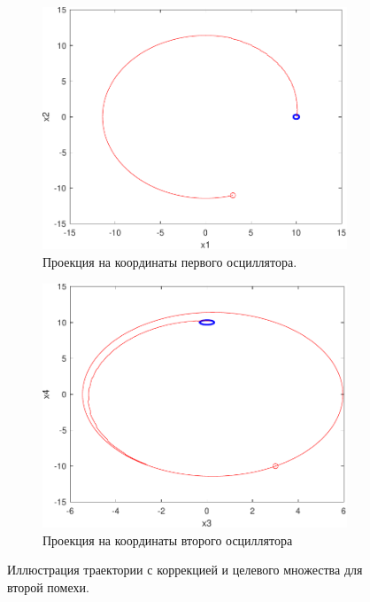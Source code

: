 \newpage

\begin{figure}[ht]
    \centering
    \begin{subfigure}[b]{0.45\textwidth}
        \centering
        \includegraphics[width=\textwidth]{./resources/synthesis_9_first.pdf}
        \caption{Проекция на координаты первого осциллятора.}
        \label{subfig:synthesis_2_first}
    \end{subfigure}
    \hfill
    \begin{subfigure}[b]{0.45\textwidth}
        \centering
        \includegraphics[width=\textwidth]{./resources/synthesis_9_second.pdf}
        \caption{Проекция на координаты второго осциллятора}
        \label{subfig:synthesis_2_second}
    \end{subfigure}
    \caption{Иллюстрация траектории с коррекцией и целевого множества для второй помехи.}
    \label{fig:synthesis_2}
\end{figure}

